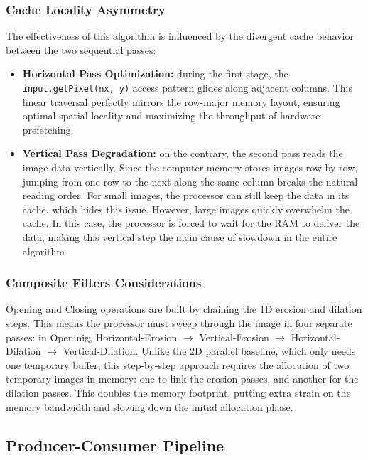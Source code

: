 \documentclass[10pt,twocolumn,letterpaper]{article}
\begin{document}
\subsubsection{Cache Locality Asymmetry}
The effectiveness of this algorithm is influenced by the divergent cache behavior between the two sequential passes:

\begin{itemize}
    \item \textbf{Horizontal Pass Optimization:} during the first stage, the \lstinline|input.getPixel(nx, y)| access pattern glides along adjacent columns. This linear traversal perfectly mirrors the row-major memory layout, ensuring optimal spatial locality and maximizing the throughput of hardware prefetching.
    \item \textbf{Vertical Pass Degradation:} on the contrary, the second pass reads the image data vertically. Since the computer memory stores images row by row, jumping from one row to the next along the same column breaks the natural reading order. For small images, the processor can still keep the data in its cache, which hides this issue. However, large images quickly overwhelm the cache. In this case, the processor is forced to wait for the RAM to deliver the data, making this vertical step the main cause of slowdown in the entire algorithm.
\end{itemize}

\subsubsection{Composite Filters Considerations}
Opening and Closing operations are built by chaining the 1D erosion and dilation steps. This means the processor must sweep through the image in four separate passes: in Openinig, Horizontal-Erosion $\rightarrow$ Vertical-Erosion $\rightarrow$ Horizontal-Dilation $\rightarrow$ Vertical-Dilation. Unlike the 2D parallel baseline, which only needs one temporary buffer, this step-by-step approach requires the allocation of two temporary images in memory: one to link the erosion passes, and another for the dilation passes. This doubles the memory footprint, putting extra strain on the memory bandwidth and slowing down the initial allocation phase.

\subsection{Producer-Consumer Pipeline}
\label{subsec:pipeline}
\end{document}

